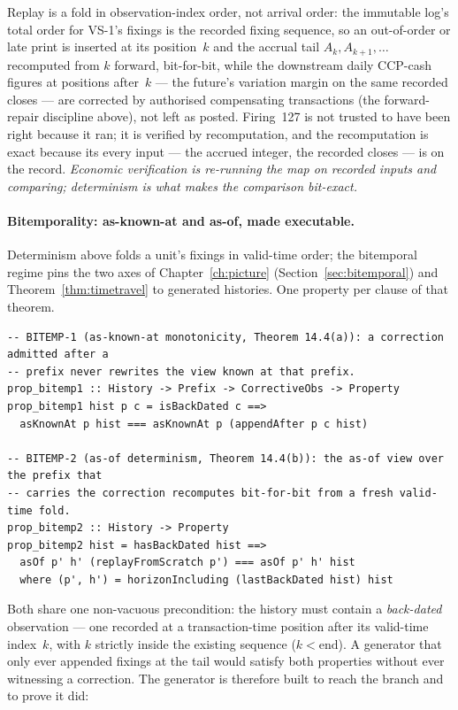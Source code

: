 \documentclass[11pt,a4paper]{article}
\begin{document}
Replay is a fold in observation-index order, not arrival order: the immutable log's total
order for VS-1's fixings is the recorded fixing sequence, so an out-of-order or late print
is inserted at its position~$k$ and the accrual tail $A_{k},A_{k+1},\dots$ recomputed from
$k$ forward, bit-for-bit, while the downstream daily CCP-cash figures at positions after~$k$
--- the future's variation margin on the same recorded closes --- are corrected by
authorised compensating transactions (the forward-repair discipline above), not left as posted. Firing~127 is not trusted to have been right
because it ran; it is verified by recomputation, and the recomputation is exact because its
every input --- the accrued integer, the recorded closes --- is on the record.
\emph{Economic verification is re-running the map on recorded inputs and comparing;
determinism is what makes the comparison bit-exact.}

\paragraph{Bitemporality: as-known-at and as-of, made executable.}
Determinism above folds a unit's fixings in valid-time order; the bitemporal regime pins the
two axes of Chapter~\ref{ch:picture} (Section~\ref{sec:bitemporal}) and
Theorem~\ref{thm:timetravel} to generated histories. One property per clause of that theorem.

\begin{lstlisting}
-- BITEMP-1 (as-known-at monotonicity, Theorem 14.4(a)): a correction admitted after a
-- prefix never rewrites the view known at that prefix.
prop_bitemp1 :: History -> Prefix -> CorrectiveObs -> Property
prop_bitemp1 hist p c = isBackDated c ==>
  asKnownAt p hist === asKnownAt p (appendAfter p c hist)

-- BITEMP-2 (as-of determinism, Theorem 14.4(b)): the as-of view over the prefix that
-- carries the correction recomputes bit-for-bit from a fresh valid-time fold.
prop_bitemp2 :: History -> Property
prop_bitemp2 hist = hasBackDated hist ==>
  asOf p' h' (replayFromScratch p') === asOf p' h' hist
  where (p', h') = horizonIncluding (lastBackDated hist) hist
\end{lstlisting}

Both share one non-vacuous precondition: the history must contain a \emph{back-dated}
observation --- one recorded at a transaction-time position after its valid-time index~$k$,
with $k$ strictly inside the existing sequence ($k < \text{end}$). A generator that only ever
appended fixings at the tail would satisfy both properties without ever witnessing a
correction. The generator is
therefore built to reach the branch and to prove it did:
\end{document}
